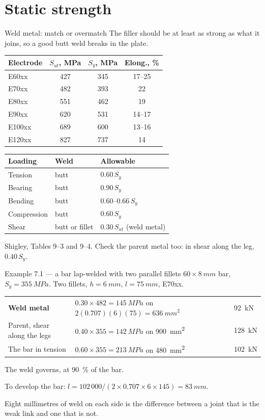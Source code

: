 \documentclass[aspectratio=169,10pt]{beamer}
\begin{document}
\section{Static strength}

\begin{frame}{Weld metal: match or overmatch}
The filler should be at least as strong as what it joins, so a good butt weld breaks in the plate.

\vfill
\centering\footnotesize
\begin{tabular}{@{}lccc@{}}
\toprule
\textbf{Electrode} & $S_{ut}$, MPa & $S_y$, MPa & Elong., \%\\
\midrule
E60xx & 427 & 345 & 17--25\\
E70xx & 482 & 393 & 22\\
E80xx & 551 & 462 & 19\\
E90xx & 620 & 531 & 14--17\\
E100xx & 689 & 600 & 13--16\\
E120xx & 827 & 737 & 14\\
\bottomrule
\end{tabular}
\qquad
\begin{tabular}{@{}lll@{}}
\toprule
\textbf{Loading} & \textbf{Weld} & \textbf{Allowable}\\
\midrule
Tension & butt & $0.60\,S_y$\\
Bearing & butt & $0.90\,S_y$\\
Bending & butt & $0.60$--$0.66\,S_y$\\
Compression & butt & $0.60\,S_y$\\
Shear & butt or fillet & $0.30\,S_{ut}$ (weld metal)\\
\bottomrule
\end{tabular}

\vfill\raggedright\normalsize
Shigley, Tables 9--3 and 9--4. \alert{Check the parent metal too}: in shear along the leg,
$0.40\,S_y$.
\end{frame}

\begin{frame}{Example 7.1 --- a bar lap-welded with two parallel fillets}
$60\times\SI{8}{mm}$ bar, $S_y=\SI{355}{MPa}$. Two fillets, $h=\SI{6}{mm}$, $l=\SI{75}{mm}$, E70xx.

\medskip
\begin{tabular}{@{}lll@{}}
\textbf{Weld metal} & $0.30\times482=\SI{145}{MPa}$ on $2(0.707)(6)(75)=\SI{636}{mm^2}$ & \alert{\SI{92}{kN}}\\[3pt]
Parent, shear along the legs & $0.40\times355=\SI{142}{MPa}$ on \SI{900}{mm^2} & \SI{128}{kN}\\[3pt]
The bar in tension & $0.60\times355=\SI{213}{MPa}$ on \SI{480}{mm^2} & \SI{102}{kN}\\
\end{tabular}

\vfill
The weld governs, at \SI{90}{\percent} of the bar.

\medskip
To develop the bar: $l=102\,000/(2\times0.707\times6\times145)=\SI{83}{mm}$.

\medskip
\alert{Eight millimetres of weld} on each side is the difference between a joint that is the weak
link and one that is not.
\end{frame}
\end{document}
